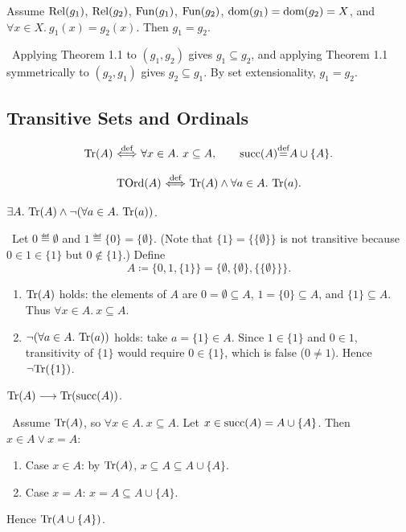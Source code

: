 \documentclass[10pt,a4paper]{article}
\begin{document}
\begin{theorem}
Assume ${\textrm{Rel}}(g_1)$, ${\textrm{Rel}}(g_2)$, ${\textrm{Fun}}(g_1)$, ${\textrm{Fun}}(g_2)$, ${\textrm{dom}}(g_1) = {\textrm{dom}}(g_2) = X$, and $\forall x\in X.\ g_1(x)=g_2(x)$. Then $g_1 = g_2$.
\end{theorem}
\myprf\ Applying Theorem 1.1 to $(g_1, g_2)$ gives $g_1 \subseteq g_2$, and applying Theorem 1.1 symmetrically to $(g_2, g_1)$ gives $g_2 \subseteq g_1$. By set extensionality, $g_1 = g_2$. \myqed
\subsection{Transitive Sets and Ordinals}
\begin{definition}
$$\Tr(A) \propdef \forall x\in A.\ x\subseteq A, \qquad \mysucc(A) \eqdef A \cup \{A\}.$$
\end{definition}

\begin{definition}
$${\textrm{TOrd}}(A) {\stackrel{{\textrm{def}}}{\ \Longleftrightarrow\ }} {\textrm{Tr}}(A)\land \forall a\in A.\ {\textrm{Tr}}(a).$$
\end{definition}

\begin{theorem}
$\exists A.\ {\textrm{Tr}}(A) \land \neg (\forall a\in A.\ {\textrm{Tr}}(a))$.
\end{theorem}
\myprf\ Let $0 \eqdef \emptyset$ and $1 \eqdef \{0\} = \{\emptyset\}$. (Note that $\{1\} = \{\{\emptyset\}\}$ is not transitive because $0 \in 1 \in \{1\}$ but $0 \notin \{1\}$.) Define
$$A \coloneqq \{0, 1, \{1\}\} = \{\emptyset, \{\emptyset\}, \{\{\emptyset\}\}\}.$$
\begin{enumerate}
\item ${\textrm{Tr}}(A)$ holds: the elements of $A$ are $0 = \emptyset \subseteq A$, $1 = \{0\} \subseteq A$, and $\{1\} \subseteq A$. Thus $\forall x \in A.\ x \subseteq A$.
\item $\neg (\forall a \in A.\ \Tr(a))$ holds: take $a = \{1\} \in A$. Since $1 \in \{1\}$ and $0 \in 1$, transitivity of $\{1\}$ would require $0 \in \{1\}$, which is false ($0 \neq 1$). Hence $\neg {\textrm{Tr}}(\{1\})$.
\end{enumerate}
\myqed

\begin{theorem}
${\textrm{Tr}}(A) \longrightarrow {\textrm{Tr}}({\textrm{succ}}(A))$.
\end{theorem}
\myprf\ Assume ${\textrm{Tr}}(A)$, so $\forall x\in A.\ x\subseteq A$. Let $x \in {\textrm{succ}}(A) = A\cup\{A\}$. Then $x\in A \lor x=A$:
\begin{enumerate}
\item Case $x\in A$: by ${\textrm{Tr}}(A)$, $x\subseteq A \subseteq A\cup\{A\}$.
\item Case $x = A$: $x = A \subseteq A\cup\{A\}$.
\end{enumerate}
Hence ${\textrm{Tr}}(A\cup\{A\})$. \myqed
\end{document}
